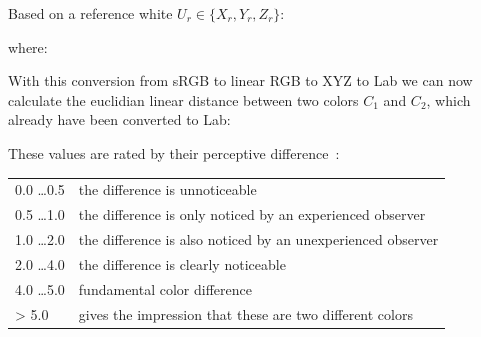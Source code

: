 
Based on a reference white $U_r \in \{X_r, Y_r, Z_r\}$:



where:





With this conversion from sRGB to linear RGB to XYZ to Lab we can now calculate 
the euclidian linear distance between two colors $C_1$ and $C_2$, which already 
have been converted to Lab:


These values are rated by their perceptive difference \cite{mokrzycki:2012}:

\begin{tabular}{l | l}
	0.0 \dots 0.5 & the difference is unnoticeable \\
	0.5 \dots 1.0 & the difference is only noticed by an experienced observer \\
	1.0 \dots 2.0 & the difference is also noticed by an unexperienced observer 
	\\
	2.0 \dots 4.0 & the difference is clearly noticeable \\
	4.0 \dots 5.0 & fundamental color difference  \\
	> 5.0 		  & gives the impression that these are two different 
	colors        
\end{tabular}

